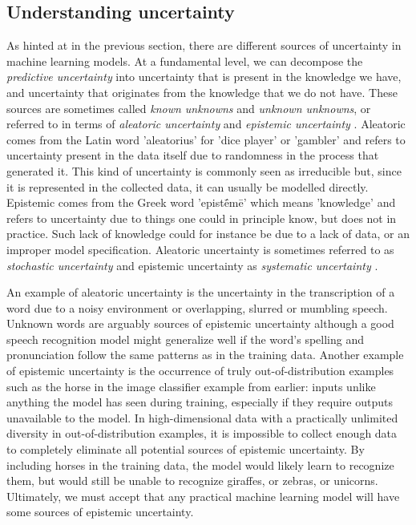 \subsection{Understanding uncertainty} \label{subsec:understanding-uncertainty}
% 
% 
As hinted at in the previous section, there are different sources of uncertainty in machine learning models. 
At a fundamental level, we can decompose the \textit{predictive uncertainty} into uncertainty that is present in the knowledge we have, and uncertainty that originates from the knowledge that we do not have.
These sources are sometimes called \emph{known unknowns} and \emph{unknown unknowns}, or referred to in terms of \textit{aleatoric uncertainty} and \textit{epistemic uncertainty} \parencite{kendall_what_2017}. 
Aleatoric comes from the Latin word 'aleatorius' for 'dice player' or 'gambler' and refers to uncertainty present in the data itself due to randomness in the process that generated it. This kind of uncertainty is commonly seen as irreducible but, since it is represented in the collected data, it can usually be modelled directly. 
Epistemic comes from the Greek word 'epistḗmē' which means 'knowledge' and refers to uncertainty due to things one could in principle know, but does not in practice. Such lack of knowledge could for instance be due to a lack of data, or an improper model specification. 
Aleatoric uncertainty is sometimes referred to as \textit{stochastic uncertainty} and epistemic uncertainty as \textit{systematic uncertainty} \parencite{kendall_what_2017}. 

An example of aleatoric uncertainty is the uncertainty in the transcription of a word due to a noisy environment or overlapping, slurred or mumbling speech. 
Unknown words are arguably sources of epistemic uncertainty although a good speech recognition model might generalize well if the word's spelling and pronunciation follow the same patterns as in the training data. Another example of epistemic uncertainty is the occurrence of truly out-of-distribution examples such as the horse in the image classifier example from earlier: inputs unlike anything the model has seen during training, especially if they require outputs unavailable to the model. 
In high-dimensional data with a practically unlimited diversity in out-of-distribution examples, it is impossible to collect enough data to completely eliminate all potential sources of epistemic uncertainty. By including horses in the training data, the model would likely learn to recognize them, but would still be unable to recognize giraffes, or zebras, or unicorns. 
Ultimately, we must accept that any practical machine learning model will have some sources of epistemic uncertainty. 

